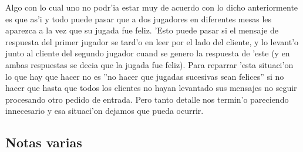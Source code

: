 Algo con lo cual uno no podr'ia estar muy de acuerdo con lo dicho anteriormente es que as'i y todo puede pasar que a dos jugadores en diferentes mesas les aparezca a la vez que su jugada fue feliz. 'Esto puede pasar si el mensaje de respuesta del primer jugador se tard'o en leer por el lado del cliente, y lo levant'o junto al cliente del segundo jugador cuand se genero la respuesta de 'este (y en ambas respuestas se decia que la jugada fue feliz). Para reparrar 'esta situaci'on lo que hay que hacer no es ''no hacer que jugadas sucesivas sean felices'' si no hacer que hasta que todos los clientes no hayan levantado sus mensajes no seguir procesando otro pedido de entrada. Pero tanto detalle nos termin'o pareciendo innecesario y esa situaci'on dejamos que pueda ocurrir.



\subsection{Notas varias}
